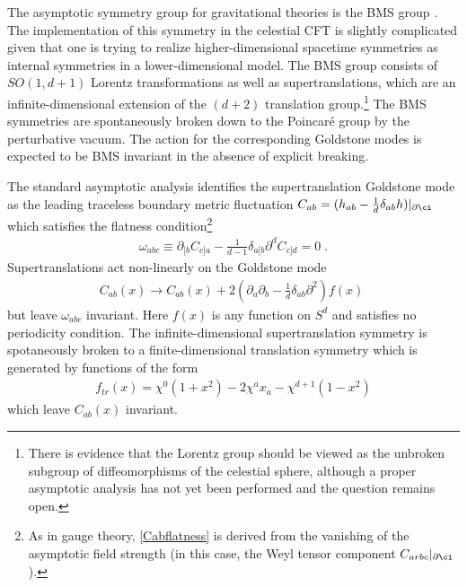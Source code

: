 \documentclass[11pt]{article}
\def\d{{\delta}}
\def\o{{\omega}}
\def\p{{\partial}}
\begin{document}
The asymptotic symmetry group for gravitational theories is the BMS group \cite{Bondi:1962px,Sachs:1962wk,He:2014laa,Kapec:2015vwa}. The implementation of this symmetry in the celestial CFT is slightly complicated given that one is trying to realize higher-dimensional spacetime symmetries as internal symmetries in a lower-dimensional model. The BMS group consists of $SO(1,d+1)$ Lorentz transformations as well as supertranslations, which are an infinite-dimensional extension of the $(d+2)$ translation group.\footnote{There is evidence that the Lorentz group should be viewed as the unbroken subgroup of diffeomorphisms of the celestial sphere, although a proper asymptotic analysis has not yet been performed and the question remains open.} The BMS symmetries are spontaneously broken down to the Poincar\'e group by the perturbative vacuum. The action for the corresponding Goldstone modes is expected to be BMS invariant in the absence of explicit breaking.

The standard asymptotic analysis identifies the supertranslation Goldstone mode as the leading traceless boundary metric fluctuation $C_{ab} = ( h_{ab} - \frac{1}{d} \d_{ab} h) |_{\p \ci}$ which satisfies the flatness condition\footnote{As in gauge theory, \eqref{Cabflatness} is derived from the vanishing of the asymptotic field strength (in this case, the Weyl tensor component $C_{arbc} |_{\p\ci}$).}
\begin{equation}
\begin{split}\label{Cabflatness}
\o_{abc} \equiv \p_{[b} C_{c]a}  - \frac{1}{d-1} \d_{a[b} \p^d C_{c]d} = 0 \; .
\end{split}
\end{equation}
Supertranslations act non-linearly on the Goldstone mode
\begin{equation}
\begin{split}\label{sttransform}
C_{ab} (x) \to C_{ab}(x) + 2  \left( \p_a \p_b - \frac{1}{d} \d_{ab} \p^2 \right) f(x) \; 
\end{split}
\end{equation}
but leave $\omega_{abc}$ invariant. Here $f(x)$ is any function on $S^d$ and satisfies no periodicity condition. The infinite-dimensional supertranslation symmetry is spotaneously broken to a finite-dimensional translation symmetry which is generated by functions of the form
\begin{equation}
\begin{split}\label{translations}
f_{tr}(x) = \chi^0  ( 1+x^2 ) - 2 \chi^a x_a - \chi^{d+1}  ( 1- x^2 ) 
\end{split}
\end{equation}
which leave $C_{ab}(x)$ invariant. 
\end{document}
